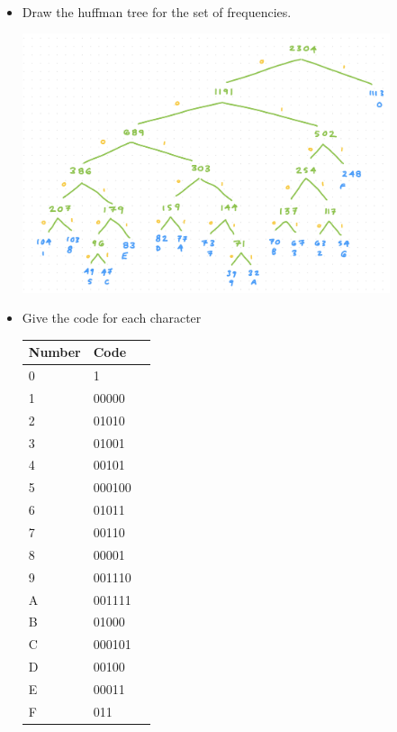 \documentclass[12pt, letterpaper]{article}
\begin{document}
\-\ \newline
\begin{itemize} 
\item Draw the huffman tree for the set of frequencies. \newline

\includegraphics[width=0.85\textwidth]{graph1.png}

\item Give the code for each character

{
\centering
\begin{tabular}{ | l | l | r | }
    \hline			
    Number & Code \\
    \hline
    \textnormal{0} & \textnormal{1} \\
    \textnormal{1} & \textnormal{00000} \\
    \textnormal{2} & \textnormal{01010} \\
    \textnormal{3} & \textnormal{01001} \\
    \textnormal{4} & \textnormal{00101} \\
    \textnormal{5} & \textnormal{000100} \\
    \textnormal{6} & \textnormal{01011} \\
    \textnormal{7} & \textnormal{00110} \\
    \textnormal{8} & \textnormal{00001} \\
    \textnormal{9} & \textnormal{001110} \\
    \textnormal{A} & \textnormal{001111} \\
    \textnormal{B} & \textnormal{01000} \\
    \textnormal{C} & \textnormal{000101} \\
    \textnormal{D} & \textnormal{00100} \\
    \textnormal{E} & \textnormal{00011} \\
    \textnormal{F} & \textnormal{011} \\
    \hline  
  \end{tabular}\par
}


\end{itemize}
\end{document}
